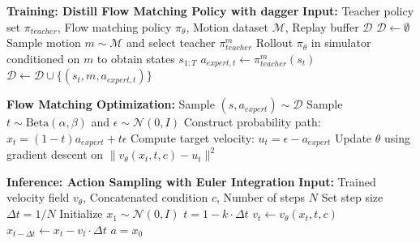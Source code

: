 \begin{algorithm}[t]
\caption{Flow-based Pretraining and Inference}
\label{alg:DAgger_fm}
\begin{algorithmic}[1]

\State \textbf{Training: Distill Flow Matching Policy with \ac{dagger}}
\State \textbf{Input:} Teacher policy set $\pi_{teacher}$, Flow matching policy $\pi_{\theta}$, Motion dataset $\mathcal{M}$, Replay buffer $\mathcal{D}$
\Repeat
    \State $\mathcal{D} \leftarrow \emptyset$ 
    \State Sample motion $m \sim \mathcal{M}$ and select teacher $\pi^{m}_{teacher}$
    \State Rollout $\pi_{\theta}$ in simulator conditioned on $m$ to obtain states $s_{1:T}$
        \State $a_{expert,t} \leftarrow \pi^{m}_{teacher}(s_t)$ 
        \State $\mathcal{D} \leftarrow \mathcal{D} \cup \{(s_t, m, a_{expert,t})\}$ 
    \EndFor
    
    \State \textbf{Flow Matching Optimization:}
        \State Sample $(s, a_{expert}) \sim \mathcal{D}$
        \State Sample $t \sim \text{Beta}(\alpha, \beta)$ and $\epsilon \sim \mathcal{N}(0, I)$
        \State Construct probability path: $x_t = (1-t)a_{expert} + t\epsilon$
        \State Compute target velocity: $u_t = \epsilon - a_{expert}$
        \State Update $\theta$ using gradient descent on $\| v_{\theta}(x_t, t, c) - u_t \|^2$
    \EndFor
{}

\Statex
\State \textbf{Inference: Action Sampling with Euler Integration}
\State \textbf{Input:} Trained velocity field $v_{\theta}$, Concatenated condition $c$, Number of steps $N$
\State Set step size $\Delta t = 1/N$
\State Initialize $x_1 \sim \mathcal{N}(0, I)$ 
    \State $t = 1 - k \cdot \Delta t$ 
    \State $v_t \leftarrow v_{\theta}(x_t, t, c)$
    \State $x_{t-\Delta t} \leftarrow x_t - v_t \cdot \Delta t$ 
\EndFor
\State \Return $a = x_0$ 
\end{algorithmic}
\end{algorithm} 
